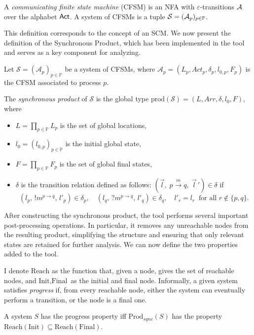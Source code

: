 \begin{definition}[CFSM] \label{def:cfsm}
    A \emph{communicating finite state machine} (CFSM) is an NFA with 
    $\varepsilon$-transitions $\mathcal{A}$ over the alphabet $\mathsf{Act}$.  
    A system of CFSMs is a tuple $\mathcal{S} = (\mathcal{A}_p)_{p \in \mathbb{P}}$.
\end{definition}

This definition corresponds to the concept of an SCM. We now present the
definition of the Synchronous Product, which has been implemented in the
tool and serves as a key component for analyzing.

\begin{definition}
Let $\mathcal{S} = (\mathcal{A}_p)_{p \in \mathbb{P}}$ be a system of CFSMs, where 
$\mathcal{A}_p = (L_p, \mathit{Act}_p, \delta_p, l_{0,p}, F_p)$ is the CFSM associated 
to process $p$.  

The \emph{synchronous product} of $\mathcal{S}$ is the global type 
$\mathrm{prod}(\mathcal{S}) = (L, \mathit{Arr}, \delta, l_0, F)$,
where
\begin{itemize}
    \item $L = \prod_{p \in \mathbb{P}} L_p$ is the set of global locations,
    \item $l_0 = (l_{0,p})_{p \in \mathbb{P}}$ is the initial global state,
    \item $F = \prod_{p \in \mathbb{P}} F_p$ is the set of global final states,
    \item $\delta$ is the transition relation defined as follows:  
    $(\vec{l}, \; p \xrightarrow{m} q, \; \vec{l}\,') \in \delta$ if
    \[
    (l_p,\, !m^{p \to q},\, l'_p) \in \delta_p, \quad 
    (l_q,\, ?m^{p \to q},\, l'_q) \in \delta_q, \quad 
    l'_r = l_r \;\; \text{for all } r \notin \{p,q\}.
    \]
\end{itemize}
\end{definition}

After constructing the synchronous product, the tool performs several
important post-processing operations. In particular, it removes any
unreachable nodes from the resulting product, simplifying the structure
and ensuring that only relevant states are retained for further analysis.
We can now define the two properties added to the tool.

I denote $\text{Reach}$ as the function that, given a node, gives the set of 
reachable nodes, and $\text{Init}, \text{Final}$ as the initial and final node.
Informally, a given system satisfies \emph{progress} if, 
from every reachable node,
either the system can eventually perform a transition, or the node is
a final one.
\begin{definition}[Progress]
	A system $S$ has the progress property iff $\text{Prod}_{sync}(S)$
	has the property
	$\text{Reach}(\text{Init})\subseteq \text{Reach}(\text{Final})$.
\end{definition}

